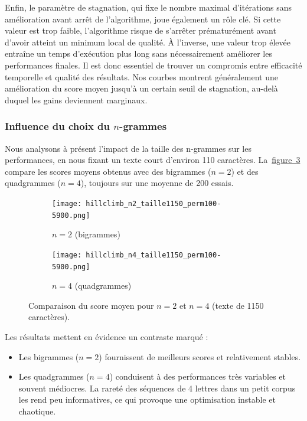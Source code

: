 \documentclass[a4paper]{article}
\newcommand{\figref}[1]{\hyperref[#1]{figure~\ref*{#1}}}
\begin{document}
Enfin, le paramètre de stagnation, qui fixe le nombre maximal d’itérations sans amélioration
avant arrêt de l’algorithme, joue également un rôle clé. Si cette valeur est trop faible, l’algorithme
risque de s’arrêter prématurément avant d’avoir atteint un minimum local de qualité. À l’inverse,
une valeur trop élevée entraîne un temps d’exécution plus long sans nécessairement améliorer les
performances finales. Il est donc essentiel de trouver un compromis entre efficacité temporelle et
qualité des résultats. Nos courbes montrent généralement une amélioration du score moyen jusqu’à
un certain seuil de stagnation, au-delà duquel les gains deviennent marginaux.

\subsubsection{Influence du choix du $n$-grammes}

Nous analysons à présent l’impact de la taille des n-grammes sur les performances, en nous fixant un texte court d’environ 110 caractères. La~\figref{fig:ngrams-1150} compare les scores moyens obtenus avec des bigrammes ($n=2$) et des quadgrammes ($n=4$), toujours sur une moyenne de 200 essais.


\begin{figure}[H]
    \centering
    \begin{subfigure}[b]{0.49\textwidth}
        \texttt{[image: hillclimb\_n2\_taille1150\_perm100-5900.png]}
        \caption{$n = 2$ (bigrammes)}
        \label{fig:n2-110}
    \end{subfigure}
    \hfill
    \begin{subfigure}[b]{0.49\textwidth}
        \texttt{[image: hillclimb\_n4\_taille1150\_perm100-5900.png]}
        \caption{$n = 4$ (quadgrammes)}
        \label{fig:n4-110}
    \end{subfigure}
    \caption{Comparaison du score moyen pour $n = 2$ et $n = 4$ (texte de 1150 caractères).}
    \label{fig:ngrams-1150}
\end{figure}
Les résultats mettent en évidence un contraste marqué :

\begin{itemize}
    \item Les bigrammes ($n=2$) fournissent de meilleurs scores et relativement stables.
    \item Les quadgrammes ($n=4$) conduisent à des performances très variables et souvent médiocres. La rareté des séquences de 4 lettres dans un petit corpus les rend peu informatives, ce qui provoque une optimisation instable et chaotique.
\end{itemize}
\end{document}

